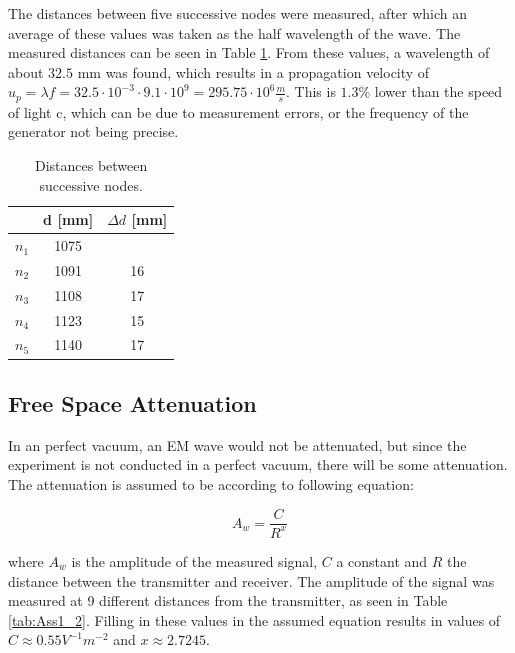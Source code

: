 The distances between five successive nodes were measured, after which an average of these values was taken as the half wavelength of the wave. The measured distances can be seen in Table \ref{tab:Ass1}. From these values, a wavelength of about $32.5$ mm was found, which results in a propagation velocity of $u_p = \lambda f = 32.5\cdot10^{-3} \cdot 9.1\cdot 10^9 = 295.75\cdot10^6 \frac{m}{s}$. This is $1.3\%$ lower than the speed of light c, which can be due to measurement errors, or the frequency of the generator not being precise.

\begin{table}[h]
\centering
\caption{Distances between successive nodes.}
\label{tab:Ass1}
\begin{tabular}{|l|c|c|}
\hline
      & \multicolumn{1}{l|}{d {[}mm{]}} & \multicolumn{1}{l|}{$\Delta d$ {[}mm{]}} \\ \hline
$n_1$ & 1075                            &                                          \\ \hline
$n_2$ & 1091                            & 16                                       \\ \hline
$n_3$ & 1108                            & 17                                       \\ \hline
$n_4$ & 1123                            & 15                                       \\ \hline
$n_5$ & 1140                            & 17                                       \\ \hline
\end{tabular}
\end{table}

\subsection*{Free Space Attenuation}

In an perfect vacuum, an EM wave would not be attenuated, but since the experiment is not conducted in a perfect vacuum, there will be some attenuation. The attenuation is assumed to be according to following equation:

\begin{equation*}
    A_w = \frac{C}{R^x}
\end{equation*}

where $A_w$ is the amplitude of the measured signal, $C$ a constant and $R$ the distance between the transmitter and receiver. The amplitude of the signal was measured at 9 different distances from the transmitter, as seen in Table \ref{tab:Ass1_2}. Filling in these values in the assumed equation results in values of $C \approx 0.55 V^{-1}m^{-2}$ and $x \approx 2.7245$.

